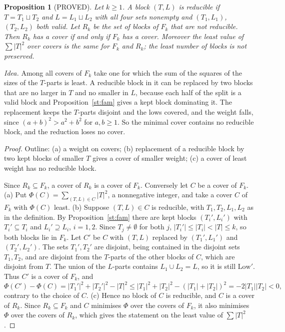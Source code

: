 \documentclass[11pt]{article}
\newtheorem{proposition}[theorem]{Proposition}
\theoremstyle{remark}
\begin{document}
\begin{proposition}[PROVED]\label{st:irr}
Let $k\ge1$. A block $(T,L)$ is \emph{reducible} if $T=T_1\sqcup T_2$ and $L=L_1\sqcup L_2$ with all four sets nonempty and $(T_1,L_1)$, $(T_2,L_2)$ both valid. Let $R_k$ be the set of blocks of $F_k$ that are not reducible. Then $R_k$ has a cover if and only if $F_k$ has a cover. Moreover the least value of $\sum|T|^2$ over covers is the same for $F_k$ and $R_k$; the least number of blocks is not preserved.
\end{proposition}
\noindent\emph{Idea.} Among all covers of $F_k$ take one for which the sum of the squares of the sizes of the $T$-parts is least. A reducible block in it can be replaced by two blocks that are no larger in $T$ and no smaller in $L$, because each half of the split is a valid block and Proposition~\ref{st:fam} gives a kept block dominating it. The replacement keeps the $T$-parts disjoint and the lows covered, and the weight falls, since $(a+b)^2>a^2+b^2$ for $a,b\ge1$. So the minimal cover contains no reducible block, and the reduction loses no cover.
\begin{proof}
Outline: (a) a weight on covers; (b) replacement of a reducible block by two kept blocks of smaller $T$ gives a cover of smaller weight; (c) a cover of least weight has no reducible block.

Since $R_k\subseteq F_k$, a cover of $R_k$ is a cover of $F_k$. Conversely let $C$ be a cover of $F_k$. (a) Put $\Phi(C)=\sum_{(T,L)\in C}|T|^2$, a nonnegative integer, and take a cover $C$ of $F_k$ with $\Phi(C)$ least.
(b) Suppose $(T,L)\in C$ is reducible, with $T_1,T_2,L_1,L_2$ as in the definition. By Proposition~\ref{st:fam} there are kept blocks $(T_i',L_i')$ with $T_i'\subseteq T_i$ and $L_i'\supseteq L_i$, $i=1,2$. Since $T_j\ne\emptyset$ for both $j$, $|T_i'|\le|T_i|<|T|\le k$, so both blocks lie in $F_k$. Let $C'$ be $C$ with $(T,L)$ replaced by $(T_1',L_1')$ and $(T_2',L_2')$. The sets $T_1',T_2'$ are disjoint, being contained in the disjoint sets $T_1,T_2$, and are disjoint from the $T$-parts of the other blocks of $C$, which are disjoint from $T$. The union of the $L$-parts contains $L_1\cup L_2=L$, so it is still $\mathrm{Low}'$. Thus $C'$ is a cover of $F_k$, and
\[
\Phi(C')-\Phi(C)=|T_1'|^2+|T_2'|^2-|T|^2\le|T_1|^2+|T_2|^2-(|T_1|+|T_2|)^2=-2|T_1||T_2|<0,
\]
contrary to the choice of $C$.
(c) Hence no block of $C$ is reducible, and $C$ is a cover of $R_k$. Since $R_k\subseteq F_k$ and $C$ minimises $\Phi$ over the covers of $F_k$, it also minimises $\Phi$ over the covers of $R_k$, which gives the statement on the least value of $\sum|T|^2$.
\end{proof}
\end{document}
